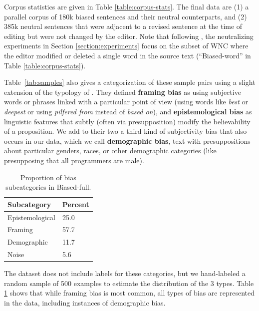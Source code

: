 Corpus statistics are given in Table \ref{table:corpus-stats}. The final data are (1) a parallel corpus of 180k biased sentences and their neutral counterparts, and (2) 385k neutral sentences that were adjacent to a revised sentence at the time of editing but were not changed by the editor. 
Note that following \citet{recasens2013linguistic}, the neutralizing experiments in Section \ref{section:experiments} focus on the  subset of WNC where the editor modified or deleted a single word in the source text (``Biased-word'' in Table \ref{table:corpus-stats}).

Table~\ref{tab:samples} also gives a categorization of these sample pairs using a slight extension of the typology of \citet{recasens2013linguistic}. They defined 
\textbf{framing bias} as using subjective words or phrases linked with a particular point of view (using words like \textit{best} or \textit{deepest} or using \textit{pilfered from} instead of \textit{based on}),  and \textbf{epistemological bias} as linguistic features that subtly (often via presupposition) modify the believability of a proposition. We add to their two a third kind of subjectivity bias that also occurs in our data, which we call \textbf{demographic bias}, text with presuppositions about particular genders, races, or other demographic categories (like presupposing that all programmers are male).  

\begin{table}[h!]
\centering
\begin{tabular}{@{}ll@{}}
\textbf{Subcategory}            & \textbf{Percent} \\ \hline \hline%
Epistemological & 25.0   \\
Framing         & 57.7   \\
Demographic     & 11.7   \\
Noise           & 5.6     \\ %
\end{tabular}
\caption{Proportion of bias subcategories in Biased-full.}
\label{tab:bias-types}
\end{table}

The dataset does not include labels for these categories, but we  hand-labeled a random sample of 500  examples to estimate the distribution of the 3 types.
Table \ref{tab:bias-types} shows that while framing bias is most common, all types of bias are represented in the data, including instances of demographic bias.


